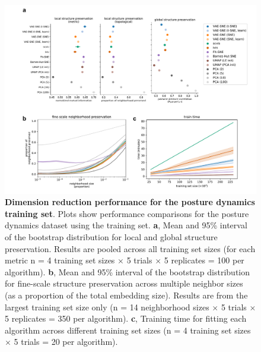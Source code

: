 \begin{figure}[!htb]
\includegraphics[width=\textwidth]{Graving_IMPRS_Thesis/figures/training_set_figure.pdf}

\caption{  \textbf{Dimension reduction performance for the posture dynamics training set}. Plots show performance comparisons for the posture dynamics dataset \citep{berman2014mapping, berman2016predictability, pereira2019fast} using the training set. \textbf{a}, Mean and 95\% interval of the bootstrap distribution for local and global structure preservation. Results are pooled across all training set sizes (for each metric n = 4 training set sizes $\times$ 5 trials $\times$ 5 replicates = 100 per algorithm). \textbf{b}, Mean and 95\% interval of the bootstrap distribution for fine-scale structure preservation across multiple neighbor sizes (as a proportion of the total embedding size). Results are from the largest training set size only (n = 14 neighborhood sizes $\times$ 5 trials $\times$ 5 replicates = 350 per algorithm). \textbf{c}, Training time for fitting each algorithm across different training set sizes (n = 4 training set sizes $\times$ 5 trials = 20 per algorithm).}

\label{fig:training_set_figure} %

\end{figure}

